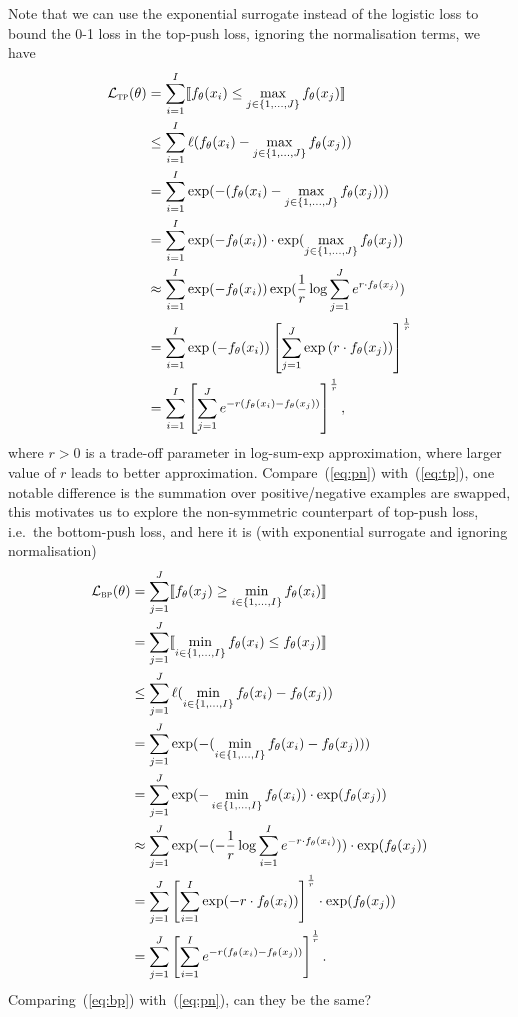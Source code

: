 \documentclass[9pt]{extarticle}
\newcommand{\llb}{\llbracket}
\newcommand{\rrb}{\rrbracket}
\newcommand{\1}{\mathbf{1}}
\newcommand{\LCal}{\mathcal{L}}
\newcommand{\ie}{i.e.\ }
\begin{document}
Note that we can use the exponential surrogate instead of the logistic loss to bound the 0-1 loss in the top-push loss, 
ignoring the normalisation terms, we have
\begin{equation}
\label{eq:tp}
\begin{aligned}
\LCal_\textsc{tp}(\theta) 
&= \sum_{i=1}^I \llb f_\theta(x_i) \le \max_{j \in \{1,\dots,J\}} f_\theta(x_j) \rrb \\
&\le \sum_{i=1}^I \ell( f_\theta(x_i) - \max_{j \in \{1,\dots,J\}} f_\theta(x_j) ) \\
&= \sum_{i=1}^I \exp(-(f_\theta(x_i) - \max_{j \in \{1,\dots,J\}} f_\theta(x_j))) \\
&= \sum_{i=1}^I \exp(-f_\theta(x_i)) \cdot \exp(\max_{j \in \{1,\dots,J\}} f_\theta(x_j)) \\
&\approx \sum_{i=1}^I \exp(-f_\theta(x_i)) \exp(\frac{1}{r} \log \sum_{j=1}^J e^{r \cdot f_\theta(x_j)}) \\
&= \sum_{i=1}^I \exp \left( -f_\theta(x_i) \right) \left[ \sum_{j=1}^J \exp \left(r \cdot f_\theta(x_j) \right) \right]^\frac{1}{r} \\
&= \sum_{i=1}^I \left[ \sum_{j=1}^J e^{-r (f_\theta(x_i) - f_\theta(x_j))} \right]^\frac{1}{r},
\end{aligned}
\end{equation}
where $r > 0$ is a trade-off parameter in log-sum-exp approximation, where larger value of $r$ leads to better approximation.
Compare~(\ref{eq:pn}) with~(\ref{eq:tp}), one notable difference is the summation over positive/negative examples are swapped,
this motivates us to explore the non-symmetric counterpart of top-push loss, \ie the bottom-push loss, 
and here it is (with exponential surrogate and ignoring normalisation)
\begin{equation}
\label{eq:bp}
\begin{aligned}
\LCal_\textsc{bp}(\theta)
&= \sum_{j=1}^J \llb f_\theta(x_j) \ge \min_{i \in \{1,\dots,I\}} f_\theta(x_i) \rrb \\
&= \sum_{j=1}^J \llb \min_{i \in \{1,\dots,I\}} f_\theta(x_i) \le f_\theta(x_j) \rrb \\
&\le \sum_{j=1}^J \ell( \min_{i \in \{1,\dots,I\}} f_\theta(x_i) - f_\theta(x_j) ) \\
&= \sum_{j=1}^J \exp(-( \min_{i \in \{1,\dots,I\}} f_\theta(x_i) - f_\theta(x_j) ) ) \\
&= \sum_{j=1}^J \exp(-\min_{i \in \{1,\dots,I\}} f_\theta(x_i)) \cdot \exp(f_\theta(x_j)) \\
&\approx \sum_{j=1}^J \exp(-(-\frac{1}{r} \log \sum_{i=1}^I e^{-r \cdot f_\theta(x_i)})) \cdot \exp(f_\theta(x_j)) \\
&= \sum_{j=1}^J \left[ \sum_{i=1}^I \exp(-r \cdot f_\theta(x_i)) \right]^\frac{1}{r} \cdot \exp(f_\theta(x_j)) \\
&= \sum_{j=1}^J \left[ \sum_{i=1}^I e^{-r (f_\theta(x_i) - f_\theta(x_j))} \right]^\frac{1}{r}.
\end{aligned}
\end{equation}
Comparing~(\ref{eq:bp}) with~(\ref{eq:pn}), can they be the same?
\end{document}
